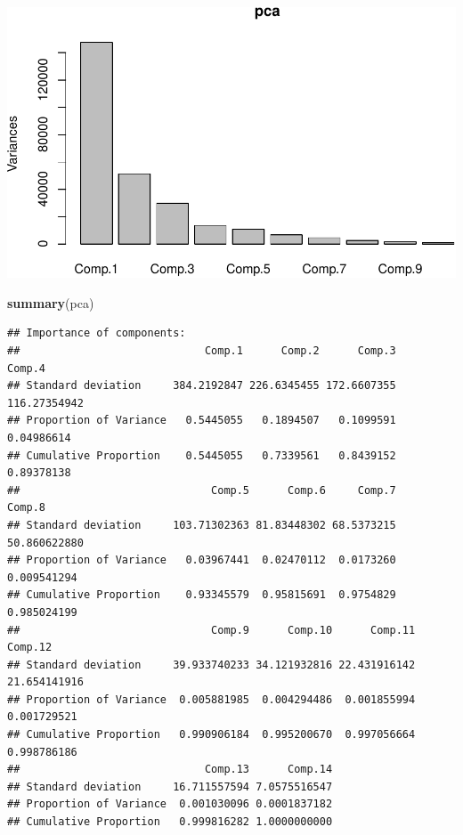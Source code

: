 \documentclass[]{article}
\newenvironment{Shaded}{\begin{snugshade}}{\end{snugshade}}
\newcommand{\KeywordTok}[1]{\textcolor[rgb]{0.13,0.29,0.53}{\textbf{{#1}}}}
\newcommand{\DataTypeTok}[1]{\textcolor[rgb]{0.13,0.29,0.53}{{#1}}}
\newcommand{\DecValTok}[1]{\textcolor[rgb]{0.00,0.00,0.81}{{#1}}}
\newcommand{\StringTok}[1]{\textcolor[rgb]{0.31,0.60,0.02}{{#1}}}
\newcommand{\NormalTok}[1]{{#1}}
\begin{document}
\includegraphics{DATA621-Homework-1_files/figure-latex/unnamed-chunk-23-1.pdf}

\begin{Shaded}
\begin{Highlighting}[]
\KeywordTok{summary}\NormalTok{(pca)}
\end{Highlighting}
\end{Shaded}

\begin{verbatim}
## Importance of components:
##                             Comp.1      Comp.2      Comp.3       Comp.4
## Standard deviation     384.2192847 226.6345455 172.6607355 116.27354942
## Proportion of Variance   0.5445055   0.1894507   0.1099591   0.04986614
## Cumulative Proportion    0.5445055   0.7339561   0.8439152   0.89378138
##                              Comp.5      Comp.6     Comp.7       Comp.8
## Standard deviation     103.71302363 81.83448302 68.5373215 50.860622880
## Proportion of Variance   0.03967441  0.02470112  0.0173260  0.009541294
## Cumulative Proportion    0.93345579  0.95815691  0.9754829  0.985024199
##                              Comp.9      Comp.10      Comp.11      Comp.12
## Standard deviation     39.933740233 34.121932816 22.431916142 21.654141916
## Proportion of Variance  0.005881985  0.004294486  0.001855994  0.001729521
## Cumulative Proportion   0.990906184  0.995200670  0.997056664  0.998786186
##                             Comp.13      Comp.14
## Standard deviation     16.711557594 7.0575516547
## Proportion of Variance  0.001030096 0.0001837182
## Cumulative Proportion   0.999816282 1.0000000000
\end{verbatim}

\begin{Shaded}
\end{Shaded}
\end{document}
